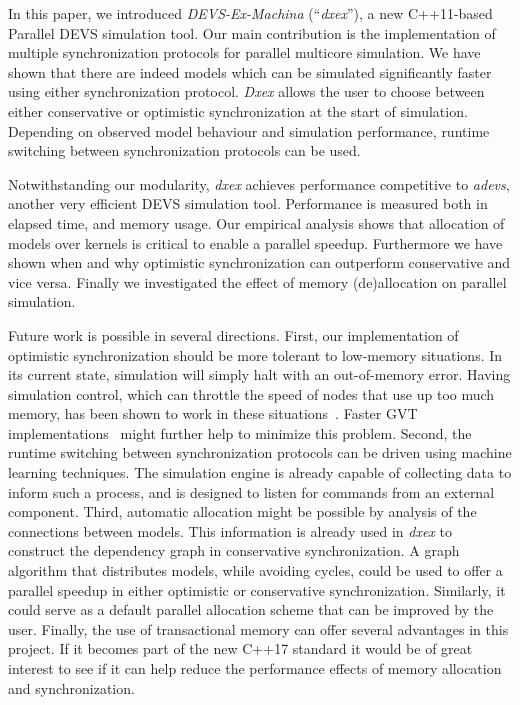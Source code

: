 In this paper, we introduced \textit{DEVS-Ex-Machina} (``\textit{dxex}''), a new C++11-based \textsf{Parallel DEVS} simulation tool.
Our main contribution is the implementation of multiple synchronization protocols for parallel multicore simulation.
We have shown that there are indeed models which can be simulated significantly faster using either synchronization protocol.
\textit{Dxex} allows the user to choose between either conservative or optimistic synchronization at the start of simulation.
Depending on observed model behaviour and simulation performance, runtime switching between synchronization protocols can be used.

Notwithstanding our modularity, \textit{dxex} achieves performance competitive to \textit{adevs}, another very efficient \textsf{DEVS} simulation tool.
Performance is measured both in elapsed time, and memory usage.
Our empirical analysis shows that allocation of models over kernels is critical to enable a parallel speedup. Furthermore we have shown when and why optimistic synchronization can outperform conservative and vice versa. Finally we investigated the effect of memory (de)allocation on parallel simulation. 

Future work is possible in several directions.
First, our implementation of optimistic synchronization should be more tolerant to low-memory situations.
In its current state, simulation will simply halt with an out-of-memory error.
Having simulation control, which can throttle the speed of nodes that use up too much memory, has been shown to work in these situations~\cite{FujimotoBook}.
Faster GVT implementations~\cite{Fujimoto:1997:CGV:268403.268404,Bauer:2005:SND:1069810.1070159} might further help to minimize this problem.
Second, the runtime switching between synchronization protocols can be driven using machine learning techniques.
The simulation engine is already capable of collecting data to inform such a process, and is designed to listen for commands from an external component.
Third, automatic allocation might be possible by analysis of the connections between models.
This information is already used in \textit{dxex} to construct the dependency graph in conservative synchronization.
A graph algorithm that distributes models, while avoiding cycles, could be used to offer a parallel speedup in either optimistic or conservative synchronization.
Similarly, it could serve as a default parallel allocation scheme that can be improved by the user.
Finally, the use of transactional memory can offer several advantages in this project.
If it becomes part of the new C++17 standard it would be of great interest to see if it can help reduce the performance effects of memory allocation and synchronization.
